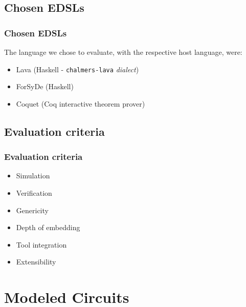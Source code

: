 \documentclass{beamer}
\begin{document}
        \subsection{Chosen EDSLs}
        \label{subsec:chosen-edsls}
            \begin{frame}
                \frametitle{Chosen EDSLs}
                The language we chose to evaluate, with the respective host language, were:

                \begin{itemize}
                    \item Lava (Haskell - \texttt{chalmers-lava} \emph{dialect})
                    \item ForSyDe (Haskell)
                    \item Coquet (Coq interactive theorem prover)
                \end{itemize}
            \end{frame}

        \subsection{Evaluation criteria}
        \label{subsec:evaluation-criteria}
            \begin{frame}
                \frametitle{Evaluation criteria}

                \begin{itemize}
                    \item Simulation
                    \item Verification
                    \item Genericity
                    \item Depth of embedding
                    \item Tool integration
                    \item Extensibility
                \end{itemize}
            \end{frame}



    \section{Modeled Circuits}
    \label{sec:modeled-circuits}
        \frame{\sectionpage}
\end{document}
